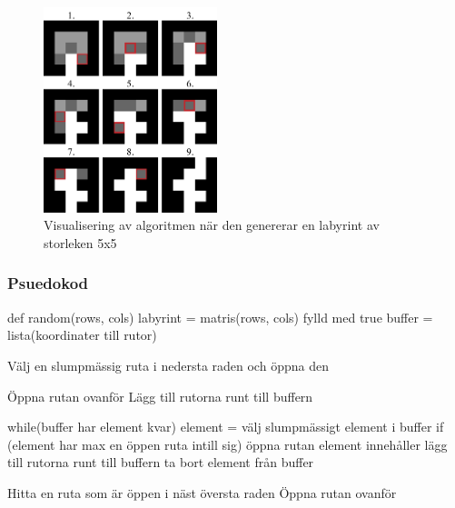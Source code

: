 \begin{figure}[h]
	\begin{center}
		\includegraphics[width=0.45\textwidth]{../img/w09-lab/AlgorithmVisualized.png}
	\end{center}
	\caption{Visualisering av algoritmen när den genererar en labyrint av storleken 5x5}
\end{figure}

\subsubsection{Psuedokod}
\begin{Code}
def random(rows, cols)
	labyrint = matris(rows, cols) fylld med true
	buffer = lista(koordinater till rutor)
	
	Välj en slumpmässig ruta i nedersta raden och öppna den
	
	Öppna rutan ovanför
	Lägg till rutorna runt till buffern
	
	while(buffer har element kvar)
		element = välj slumpmässigt element i buffer
		if (element har max en öppen ruta intill sig)
			öppna rutan element innehåller
			lägg till rutorna runt till buffern
		ta bort element från buffer
	
	Hitta en ruta som är öppen i näst översta raden
	Öppna rutan ovanför
\end{Code}



